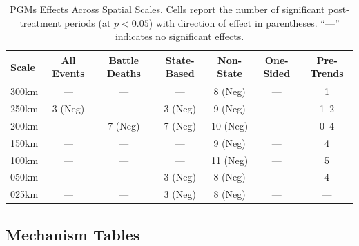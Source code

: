 \documentclass[11pt]{article}
\begin{document}




\begin{table}[H]
\centering
\caption{PGMs Effects Across Spatial Scales. Cells report the number of significant post-treatment periods (at $p<0.05$) with direction of effect in parentheses. ``---'' indicates no significant effects.}
\label{tab:pgms_robustness}
\begin{tabular}{lcccccc}
\toprule
Scale & All Events & Battle Deaths & State-Based & Non-State & One-Sided & Pre-Trends \\
\midrule
300km & ---       & ---           & ---         & 8 (Neg)   & ---       & 1          \\
250km & 3 (Neg)   & ---           & 3 (Neg)     & 9 (Neg)   & ---       & 1--2       \\
200km & ---       & 7 (Neg)       & 7 (Neg)     & 10 (Neg)  & ---       & 0--4       \\
150km & ---       & ---           & ---         & 9 (Neg)   & ---       & 4          \\
100km & ---       & ---           & ---         & 11 (Neg)  & ---       & 5          \\
050km & ---       & ---           & 3 (Neg)     & 8 (Neg)   & ---       & 4          \\
025km & ---       & ---           & 3 (Neg)     & 8 (Neg)   & ---       & ---        \\
\bottomrule
\end{tabular}
\end{table}

\subsection{Mechanism Tables}






\end{document}
